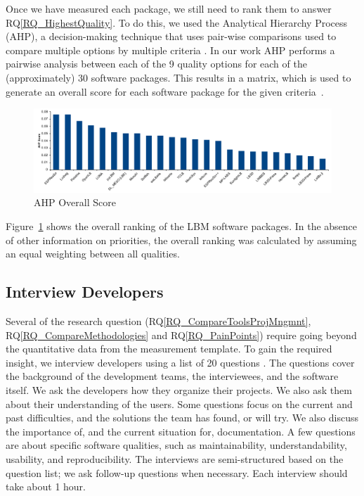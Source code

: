 \documentclass[runningheads]{llncs}
\newcommand{\rqref}[1]{RQ\ref{#1}}
\begin{document}
Once we have measured each package, we still need to rank them to answer
\rqref{RQ_HighestQuality}.  To do this, we used the Analytical Hierarchy Process
(AHP), a decision-making technique that uses pair-wise comparisons used to
compare multiple options by multiple criteria \cite{Saaty1980}. In our work AHP
performs a pairwise analysis between each of the 9 quality options for each of
the (approximately) 30 software packages.  This results in a matrix, which is
used to generate an overall score for each software package for the given
criteria~\cite{SmithEtAl2016}.

\begin{figure}[h!]
	\centering
		\includegraphics[width=1.0\textwidth]{./figures/finalscore_chart.pdf}
		\caption{AHP Overall Score}
		\label{Fig_OverallScore}
\end{figure}

Figure~\ref{Fig_OverallScore} shows the overall ranking of the LBM software
packages. In the absence of other information on priorities, the overall ranking
was calculated by assuming an equal weighting between all qualities.

\subsection{Interview Developers} \label{SecSurvey}

Several of the research question (\rqref{RQ_CompareToolsProjMngmnt},
\rqref{RQ_CompareMethodologies} and \rqref{RQ_PainPoints}) require going beyond
the quantitative data from the measurement template. To gain the required
insight, we interview developers using a list of 20 questions
\cite{SmithEtAl2021}. The questions cover the background of the development
teams, the interviewees, and the software itself. We ask the developers how they
organize their projects. We also ask them about their understanding of the
users. Some questions focus on the current and past difficulties, and the
solutions the team has found, or will try. We also discuss the importance of,
and the current situation for, documentation. A few questions are about specific
software qualities, such as maintainability, understandability, usability, and
reproducibility. The interviews are semi-structured based on the question list;
we ask follow-up questions when necessary.  Each interview should take about 1
hour.
\end{document}
